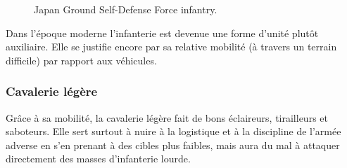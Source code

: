 \documentclass{article}
\begin{document}
\begin{center}
\begin{figure}[H]
\begin{minipage}[H]{0.6\linewidth}
	\caption{Japan Ground Self-Defense Force infantry. \cite{infantery}}
\end{minipage}
\hfill
\end{figure}
\end{center}

Dans l'époque moderne l'infanterie est devenue une forme d'unité plutôt auxiliaire. Elle se justifie encore par sa relative mobilité (à travers un terrain difficile) par rapport aux véhicules.

\subsubsection{Cavalerie légère}
Grâce à sa mobilité, la cavalerie légère fait de bons éclaireurs, tirailleurs et saboteurs. Elle sert surtout à nuire à la logistique et à la discipline de l'armée adverse en s'en prenant à des cibles plus faibles, mais aura du mal à attaquer directement des masses d'infanterie lourde.
\end{document}

